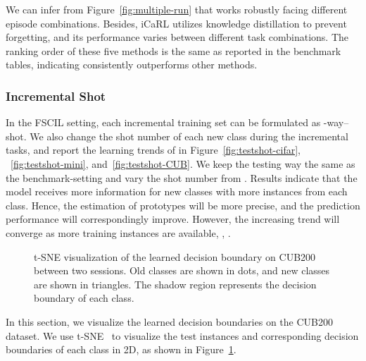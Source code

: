 We can infer from Figure~\ref{fig:multiple-run} that \name works robustly facing different episode combinations. Besides, iCaRL utilizes knowledge distillation to prevent forgetting, and its performance varies between different task combinations. The ranking order of these five methods is the same as reported in the benchmark tables, indicating \name consistently outperforms other methods.

\subsubsection{Incremental Shot}
In the FSCIL setting, each incremental training set  can be formulated as -way--shot.
We also change the shot number   of each new class during the incremental tasks, and report the learning trends of \name in Figure~\ref{fig:testshot-cifar}, ~\ref{fig:testshot-mini}, and~\ref{fig:testshot-CUB}. 
 We keep the testing way the same as the benchmark-setting and vary the shot number from .
Results indicate that the model receives more information for new classes with more instances from each class. 
 Hence, the estimation of prototypes will be more precise, and the prediction performance will correspondingly improve. However, the increasing trend will converge as more training instances are available, \eg, .



\begin{figure}[t]
	\begin{center}
		
	\end{center}
	\caption{ t-SNE visualization of the learned decision boundary on CUB200 between two sessions. Old classes are shown in dots, and new classes are shown in triangles. The shadow region represents the decision boundary of each class. 
	} \label{figure:tsne}
\end{figure}


In this section, we visualize the learned decision boundaries on the CUB200 dataset.  We use t-SNE~\cite{van2008visualizing} to visualize the test instances and corresponding decision boundaries of each class in 2D, as shown in Figure~\ref{figure:tsne}. 

